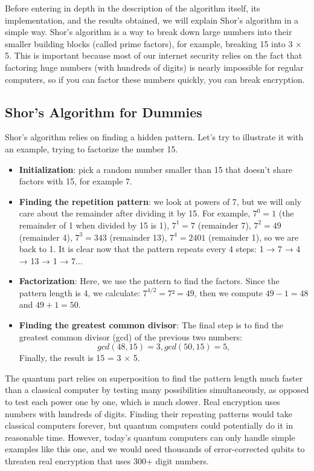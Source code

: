 \documentclass[conference,twoside]{IEEEtran}
\begin{document}
Before entering in depth in the description of the algorithm itself, its implementation, and the results obtained, we will explain Shor's algorithm in a simple way. Shor's algorithm is a way to break down large numbers into their smaller building blocks (called prime factors), for example, breaking 15 into 3 × 5. This is important because most of our internet security relies on the fact that factoring huge numbers (with hundreds of digits) is nearly impossible for regular computers, so if you can factor these numbers quickly, you can break encryption. 

\subsection{Shor's Algorithm for Dummies}
Shor's algorithm relies on finding a hidden pattern. Let's try to illustrate it with an example, trying to factorize the number 15.
\begin{itemize}
    \item \textbf{Initialization}: pick a random number smaller than 15 that doesn't share factors with 15, for example 7.
    \item \textbf{Finding the repetition pattern}: we look at powers of 7, but we will only care about the remainder after dividing it by 15. For example, \(7^{0} = 1\) (the remainder of 1 when divided by 15 is 1), \(7^{1} = 7\) (remainder 7), \(7^{2} = 49\) (remainder 4), \(7^{3} = 343\) (remainder 13), \(7^{4} = 2401\) (remainder 1), so we are back to 1. It is clear now that the pattern repeats every 4 steps: 
    1 → 7 → 4 → 13 → 1 → 7...
    \item \textbf{Factorization}: Here, we use the pattern to find the factors. Since the pattern length is 4, we calculate: \(7^{4/2} = 7² = 49 \), then we compute \(49 - 1 = 48\) and \(49 + 1 = 50\).
    \item \textbf{Finding the greatest common divisor}: The final step is to find the greatest common divisor (gcd) of the previous two numbers: 
    \begin{equation}
     gcd(48, 15) = 3, %
     gcd(50, 15) = 5, %
    \end{equation}
Finally, the result is 15 = 3 × 5.
\end{itemize}

The quantum part relies on superposition to find the pattern length much faster than a classical computer by testing many possibilities simultaneously, as opposed to test each power one by one, which is much slower. Real encryption uses numbers with hundreds of digits. Finding their repeating patterns would take classical computers forever, but quantum computers could potentially do it in reasonable time. However, today's quantum computers can only handle simple examples like this one, and we would need thousands of error-corrected qubits to threaten real encryption that uses 300+ digit numbers.
\end{document}
